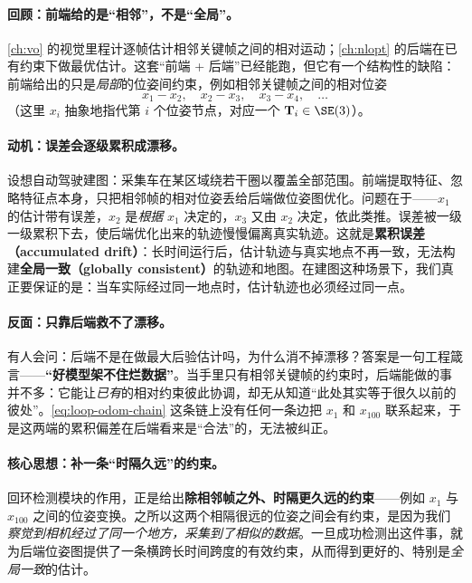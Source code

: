 \paragraph{回顾：前端给的是“相邻”，不是“全局”。}
\cref{ch:vo} 的视觉里程计逐帧估计相邻关键帧之间的相对运动；\cref{ch:nlopt} 的后端在已有约束下做最优估计。这套“前端 + 后端”已经能跑，但它有一个结构性的缺陷：前端给出的只是\emph{局部}的位姿间约束\cite{gaoxiang2019slam14}，例如相邻关键帧之间的相对位姿
\begin{equation}
  x_1 - x_2,\quad x_2 - x_3,\quad x_3 - x_4,\quad\dots
  \label{eq:loop-odom-chain}
\end{equation}
（这里 $x_i$ 抽象地指代第 $i$ 个位姿节点，对应一个 $\mathbf T_i\in\SE(3)$）。

\paragraph{动机：误差会逐级累积成漂移。}
设想自动驾驶建图：采集车在某区域绕若干圈以覆盖全部范围\cite{gaoxiang2019slam14}。前端提取特征、忽略特征点本身，只把相邻帧的相对位姿丢给后端做位姿图优化。问题在于——$x_1$ 的估计带有误差，$x_2$ 是\emph{根据} $x_1$ 决定的，$x_3$ 又由 $x_2$ 决定，依此类推。误差被一级一级累积下去，使后端优化出来的轨迹慢慢偏离真实轨迹。这就是\textbf{累积误差（accumulated drift）}：长时间运行后，估计轨迹与真实地点不再一致，无法构建\textbf{全局一致（globally consistent）}的轨迹和地图。在建图这种场景下，我们真正要保证的是：当车实际经过同一地点时，估计轨迹也必须经过同一点。

\paragraph{反面：只靠后端救不了漂移。}
有人会问：后端不是在做最大后验估计吗，为什么消不掉漂移？答案是一句工程箴言——\textbf{“好模型架不住烂数据”}。当手里只有相邻关键帧的约束时，后端能做的事并不多：它能让\emph{已有}的相对约束彼此协调，却无从知道“此处其实等于很久以前的彼处”。\cref{eq:loop-odom-chain} 这条链上没有任何一条边把 $x_1$ 和 $x_{100}$ 联系起来，于是这两端的累积偏差在后端看来是“合法”的，无法被纠正。

\paragraph{核心思想：补一条“时隔久远”的约束。}
回环检测模块的作用，正是给出\textbf{除相邻帧之外、时隔更久远的约束}\cite{gaoxiang2019slam14}——例如 $x_1$ 与 $x_{100}$ 之间的位姿变换。之所以这两个相隔很远的位姿之间会有约束，是因为我们\emph{察觉到相机经过了同一个地方，采集到了相似的数据}。一旦成功检测出这件事，就为后端位姿图提供了一条横跨长时间跨度的有效约束，从而得到更好的、特别是\emph{全局一致}的估计。

